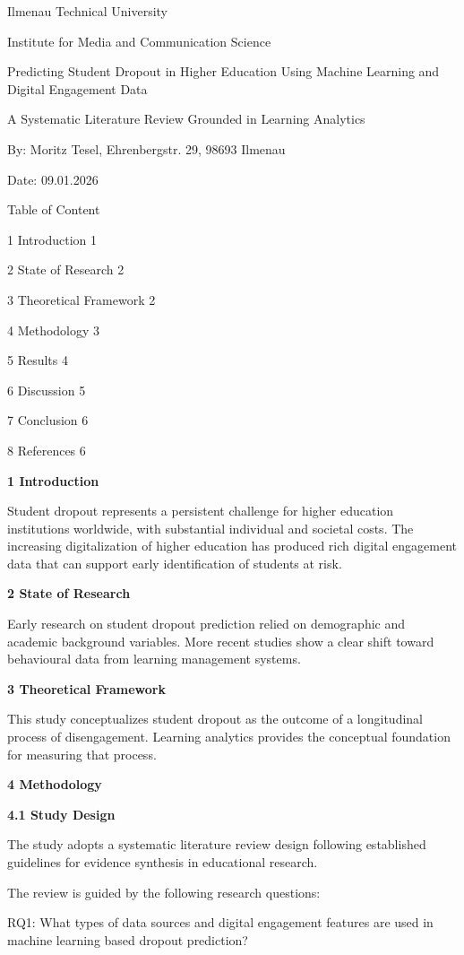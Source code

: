 \documentclass[12pt]{article}
\begin{document}
Ilmenau Technical University

Institute for Media and Communication Science

Predicting Student Dropout in Higher Education Using Machine Learning and Digital Engagement Data

A Systematic Literature Review Grounded in Learning Analytics

By: Moritz Tesel, Ehrenbergstr. 29, 98693 Ilmenau

Date: 09.01.2026


Table of Content

1 Introduction 1

2 State of Research 2

3 Theoretical Framework 2

4 Methodology 3

5 Results 4

6 Discussion 5

7 Conclusion 6

8 References 6


\textbf{1 Introduction}

Student dropout represents a persistent challenge for higher education institutions worldwide, with substantial individual and societal costs. The increasing digitalization of higher education has produced rich digital engagement data that can support early identification of students at risk.

\textbf{2 State of Research}

Early research on student dropout prediction relied on demographic and academic background variables. More recent studies show a clear shift toward behavioural data from learning management systems.

\textbf{3 Theoretical Framework}

This study conceptualizes student dropout as the outcome of a longitudinal process of disengagement. Learning analytics provides the conceptual foundation for measuring that process.

\textbf{4 Methodology}

\textbf{4.1 Study Design}

The study adopts a systematic literature review design following established guidelines for evidence synthesis in educational research.

The review is guided by the following research questions:

RQ1: What types of data sources and digital engagement features are used in machine learning based dropout prediction?
\end{document}
